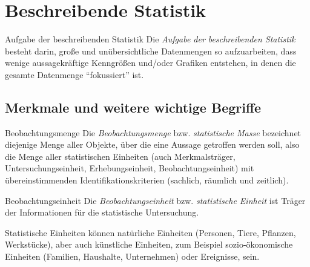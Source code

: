 \section{Beschreibende Statistik}

\begin{bonus}{Aufgabe der beschreibenden Statistik}
    Die \emph{Aufgabe der beschreibenden Statistik} besteht darin, große und unübersichtliche Datenmengen so aufzuarbeiten, dass wenige aussagekräftige Kenngrößen und/oder Grafiken entstehen, in denen die gesamte Datenmenge \enquote{fokussiert} ist. 
\end{bonus}

\subsection{Merkmale und weitere wichtige Begriffe}

\begin{defi}{Beobachtungsmenge}
    Die \emph{Beobachtungsmenge} bzw. \emph{statistische Masse} bezeichnet diejenige Menge aller Objekte, über die eine Aussage getroffen werden soll, also die Menge aller statistischen Einheiten (auch Merkmalsträger, Untersuchungseinheit, Erhebungseinheit, Beobachtungseinheit) mit übereinstimmenden Identifikationskriterien (sachlich, räumlich und zeitlich).
\end{defi}

\begin{defi}{Beobachtungseinheit}
    Die \emph{Beobachtungseinheit} bzw. \emph{statistische Einheit} ist Träger der Informationen für die statistische Untersuchung. 
    
    Statistische Einheiten können natürliche Einheiten (Personen, Tiere, Pflanzen, Werkstücke), aber auch künstliche Einheiten, zum Beispiel sozio-ökonomische Einheiten (Familien, Haushalte, Unternehmen) oder Ereignisse, sein.
\end{defi}

